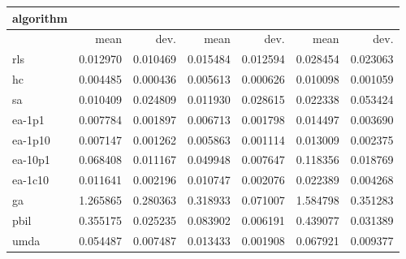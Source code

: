 \begin{tabular}{@{}l*{6}{>{{}}N{1}{2}}@{}}
\toprule
{algorithm} &  &  &  \\
\midrule
& {mean} & {dev.} & {mean} & {dev.} & {mean} & {dev.} \\
\midrule
rls & 0.012970 & 0.010469 & 0.015484 & 0.012594 & 0.028454 & 0.023063 \\
 hc & 0.004485 & 0.000436 & 0.005613 & 0.000626 & 0.010098 & 0.001059 \\
 sa & 0.010409 & 0.024809 & 0.011930 & 0.028615 & 0.022338 & 0.053424 \\
 ea-1p1 & 0.007784 & 0.001897 & 0.006713 & 0.001798 & 0.014497 & 0.003690 \\
 ea-1p10 & 0.007147 & 0.001262 & 0.005863 & 0.001114 & 0.013009 & 0.002375 \\
 ea-10p1 & 0.068408 & 0.011167 & 0.049948 & 0.007647 & 0.118356 & 0.018769 \\
 ea-1c10 & 0.011641 & 0.002196 & 0.010747 & 0.002076 & 0.022389 & 0.004268 \\
 ga & 1.265865 & 0.280363 & 0.318933 & 0.071007 & 1.584798 & 0.351283 \\
 pbil & 0.355175 & 0.025235 & 0.083902 & 0.006191 & 0.439077 & 0.031389 \\
 umda & 0.054487 & 0.007487 & 0.013433 & 0.001908 & 0.067921 & 0.009377 \\
 \bottomrule
\end{tabular}
